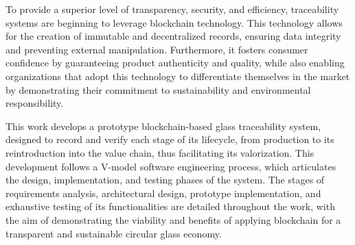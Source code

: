 To provide a superior level of transparency, security, and efficiency, traceability systems are beginning to leverage blockchain technology. This technology allows for the creation of immutable and decentralized records, ensuring data integrity and preventing external manipulation. Furthermore, it fosters consumer confidence by guaranteeing product authenticity and quality, while also enabling organizations that adopt this technology to differentiate themselves in the market by demonstrating their commitment to sustainability and environmental responsibility.

This work develops a prototype blockchain-based glass traceability system, designed to record and verify each stage of its lifecycle, from production to its reintroduction into the value chain, thus facilitating its valorization. This development follows a V-model software engineering process, which articulates the design, implementation, and testing phases of the system. The stages of requirements analysis, architectural design, prototype implementation, and exhaustive testing of its functionalities are detailed throughout the work, with the aim of demonstrating the viability and benefits of applying blockchain for a transparent and sustainable circular glass economy.
